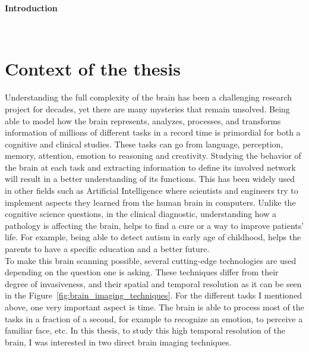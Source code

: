 

\newpage

{\huge\textbf{Introduction}\par}
\HRule \\[0.4cm] %
\section*{Context of the thesis}

Understanding the full complexity of the brain has been a challenging research project for decades, yet there are many mysteries that remain unsolved.
Being able to model how the brain represents, analyzes, processes, and transforms information of millions of different tasks in a record time is primordial for both a cognitive and clinical studies. These tasks can go from language, perception, memory, attention, emotion to reasoning and creativity. Studying the behavior of the brain at each task and extracting information to define its involved network will result in a better understanding of its functions. This has been widely used in other fields such as Artificial Intelligence where scientists and engineers try to implement aspects they learned from the human brain in computers. Unlike the cognitive science questions, in the clinical diagnostic, understanding how a pathology is affecting the brain, helps to find a cure or a way to improve patients' life. For example, being able to detect autism in early age of childhood, helps the parents to have a specific education and a better future.\\

To make this brain scanning possible, several cutting-edge technologies are used  depending on the question one is asking. These techniques differ from their degree of invasiveness, and their spatial and temporal resolution as it can be seen in the Figure~\ref{fig:brain_imaging_techniques}.
For the different tasks I mentioned above, one very important aspect is time. The brain is able to process most of the tasks in a fraction of a second, for example to recognize an emotion, to perceive a familiar face, etc. In this thesis, to study this high temporal resolution of the brain, I was interested in two direct brain imaging techniques.\\


